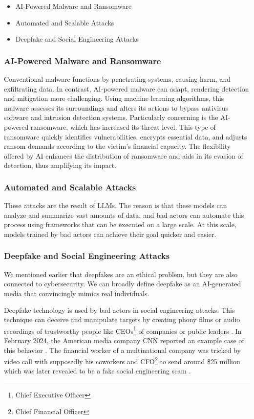 \begin{itemize}
    \item AI-Powered Malware and Ransomware
    \item Automated and Scalable Attacks
    \item Deepfake and Social Engineering Attacks
\end{itemize}

\subsubsection*{AI-Powered Malware and Ransomware}

Conventional malware functions by penetrating systems, causing harm, and exfiltrating data. In contrast, AI-powered malware can adapt, rendering detection and mitigation more challenging. Using machine learning algorithms, this malware assesses its surroundings and alters its actions to bypass antivirus software and intrusion detection systems. Particularly concerning is the AI-powered ransomware, which has increased its threat level. This type of ransomware quickly identifies vulnerabilities, encrypts essential data, and adjusts ransom demands according to the victim's financial capacity. The flexibility offered by AI enhances the distribution of ransomware and aids in its evasion of detection, thus amplifying its impact.~\cite{Princess-Egbuna_2021}

\subsubsection*{Automated and Scalable Attacks}

These attacks are the result of LLMs. The reason is that these models can analyze and summarize vast amounts of data, and bad actors can automate this process using frameworks that can be executed on a large scale. At this scale, models trained by bad actors can achieve their goal quicker and easier.~\cite{Princess-Egbuna_2021}

\subsubsection*{Deepfake and Social Engineering Attacks}

We mentioned earlier that deepfakes are an ethical problem, but they are also connected to cybersecurity. We can broadly define deepfake as an AI-generated media that convincingly mimics real individuals.

Deepfake technology is used by bad actors in social engineering attacks. This technique can deceive and manipulate targets by creating phony films or audio recordings of trustworthy people like CEOs\footnote{Chief Executive Officer} of companies or public leaders \cite{Princess-Egbuna_2021}. In February 2024, the American media company CNN reported an example case of this behavior \cite{deepfake_CFO}. The financial worker of a multinational company was tricked by video call with supposedly his coworkers and CFO\footnote{Chief Financial Officer} to send around \$25 million which was later revealed to be a fake social engineering scam \cite{deepfake_CFO}.

